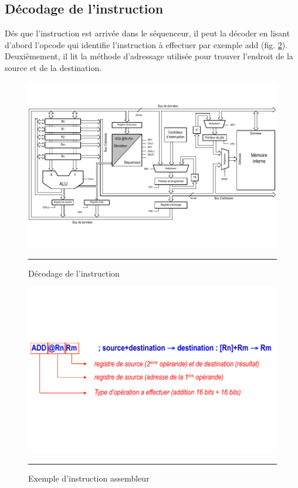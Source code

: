 \newpage
\subsection{Décodage de l'instruction}
Dés que l'instruction est arrivée dans le séquenceur, il peut la décoder en lisant d'abord l'opcode qui identifie l'instruction à effectuer par exemple add (fig. \ref{fig:opcode1}). Deuxièmement, il lit la méthode d'adressage utilisée pour trouver l'endroit de la source et de la destination. 

\begin{figure}[htb]
  \centering
  \includegraphics[angle=0, width=15cm, trim=0 30 0 30,clip]{./Figures/cpu/instruction2.pdf}
  \rule{35em}{0.5pt}
  \caption[instr2]{Décodage de l'instruction}
  \label{fig:instr2}
\end{figure}

\begin{figure}[htb]
  \centering
  \includegraphics[angle=0, width=12cm, trim=0 90 0 90,clip]{./Figures/cpu/opcode1.pdf}
  \rule{35em}{0.5pt}
  \caption[opcode1]{Exemple d'instruction assembleur}
  \label{fig:opcode1}
\end{figure}

